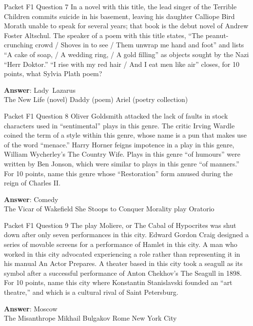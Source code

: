 \begin{frame}{Packet F1 Question 7}
In a novel with this title, the lead singer of the Terrible Children commits suicide in his basement, leaving his daughter Calliope Bird Morath unable to speak for several years; that book is the debut novel of Andrew Foster Altschul. The speaker of a poem with this title states, “The peanut-crunching   crowd / Shoves in to see / Them unwrap me hand and foot” and lists “A cake of soap, / A wedding ring, / A gold filling” as objects sought by the Nazi “Herr Doktor.”   “I rise with my red hair / And I eat men like air” closes, for 10 points, what Sylvia Plath poem?    

\textbf{Answer}: Lady\ Lazarus\\
 The New Life (novel)
 Daddy (poem)
 Ariel (poetry collection)
\end{frame}

\begin{frame}{Packet F1 Question 8}
Oliver Goldsmith attacked   the lack of faults in stock characters used in “sentimental” plays in this genre.   The critic Irving Wardle coined the term of a style within this genre, whose name is a pun that makes use of the word “menace.” Harry Horner feigns impotence in a play in this genre, William Wycherley’s The Country Wife. Plays in this genre “of humours” were written by Ben Jonson, which were similar to plays in this genre “of manners.” For 10 points, name this genre whose “Restoration” form amused during the reign of Charles II.    

\textbf{Answer}: Comedy\\
 The Vicar of Wakefield
 She Stoops to Conquer
 Morality play
 Oratorio
\end{frame}

\begin{frame}{Packet F1 Question 9}
The play Moliere, or The   Cabal of Hypocrites was shut down after   only seven performances in this city. Edward Gordon Craig designed a series of movable screens for a performance of Hamlet in this city. A man who worked in this city advocated experiencing a role rather than representing it in his manual An Actor Prepares. A theater based in this city took a seagull as its symbol after a successful performance of Anton Chekhov’s The Seagull in 1898. For 10 points, name this city where Konstantin Stanislavski founded an “art theatre,” and which is a cultural rival of Saint Petersburg.    

\textbf{Answer}: Moscow\\
 The Misanthrope
 Mikhail Bulgakov
 Rome
 New York City
\end{frame}

